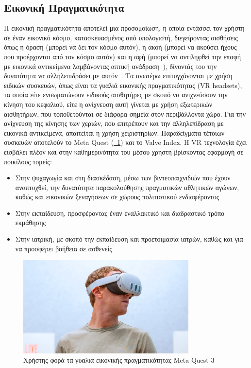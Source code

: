 \subsection{Εικονική Πραγματικότητα}\label{subsec:virtualReality}
Η εικονική πραγματικότητα αποτελεί μια προσομοίωση, η οποία εντάσσει τον χρήστη σε έναν εικονικό κόσμο, κατασκευασμένος από υπολογιστή, διεγείροντας αισθήσεις όπως η όραση (μπορεί να δει τον κόσμο αυτόν), η ακοή (μπορεί να ακούσει ήχους που προέρχονται από τον κόσμο αυτόν) και η αφή (μπορεί να αντιληφθεί την επαφή με εικονικά αντικείμενα λαμβάνοντας απτική ανάδραση~\cite{weiler_2023_phantom,perret_2018_touching}), δίνοντάς του την δυνατότητα να αλληλεπιδράσει με αυτόν~\cite{lowood_2018_virtual}. Τα ανωτέρω επιτυγχάνονται με χρήση ειδικών συσκευών, όπως είναι τα γυαλιά εικονικής πραγματικότητας (VR headsets), τα οποία είτε ενσωματώνουν ειδικούς αισθητήρες με σκοπό να ανιχνεύσουν την κίνηση του κεφαλιού, είτε η ανίχνευση αυτή γίνεται με χρήση εξωτερικών αισθητήρων, που τοποθετούνται σε διάφορα σημεία στον περιβάλλοντα χώρο. Για την ανίχνευση της κίνησης των χεριών, που επιτρέπουν και την αλληλεπίδραση με εικονικά αντικείμενα, απαιτείται η χρήση χειριστηρίων. Παραδείγματα τέτοιων συσκευών αποτελούν το Meta Quest (\hyperref[fig:meta_quest_3]{\schema~\ref*{fig:meta_quest_3}}) και το Valve Index. Η VR τεχνολογία έχει εισβάλει πλέον και στην καθημερινότητα του μέσου χρήστη βρίσκοντας εφαρμογή σε ποικίλους τομείς:
\begin{itemize}
    \item Στην ψυχαγωγία και στη διασκέδαση, μέσω των βιντεοπαιχνιδιών που έχουν αναπτυχθεί, την δυνατότητα παρακολούθησης πραγματικών αθλητικών αγώνων, καθώς και εικονικών ξεναγήσεων σε χώρους πολιτιστικού ενδιαφέροντος~\cite{loeffler_1993_distributed,meta_2022_xtadium,ansari_2021_implementing}
    \item Στην εκπαίδευση, προσφέροντας έναν εναλλακτικό και διαδραστικό τρόπο εκμάθησης~\cite{hamad_2022_how,kavanagh_2017_a,freina_2015_a}
    \item Στην ιατρική, με σκοπό την εκπαίδευση και προετοιμασία ιατρών, καθώς και για να προσφέρει βοήθεια σε ασθενείς~\cite{chirico_2015_virtual,hamad_2022_how,snoswell_2019_immersive,gerup_2020_augmented}
\end{itemize}
\begin{figure}[!h]
    \centering
    \includegraphics[width=90mm]{images/meta_quest_3.jpg}
    \caption{Χρήστης φορά τα γυαλιά εικονικής πραγματικότητας Meta Quest 3}\label{fig:meta_quest_3}
\end{figure}

